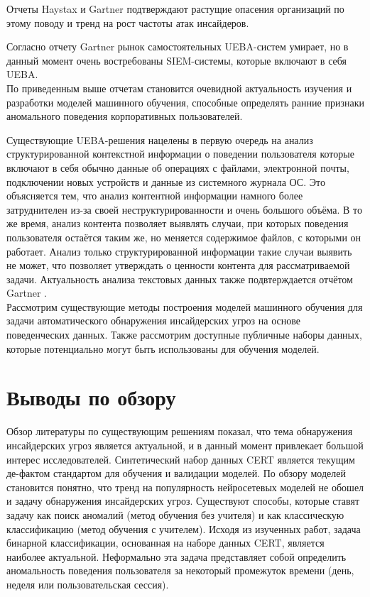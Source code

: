 Отчеты Haystax \cite{veriatoInsiderThreatReport}\cite{companyInsiderThreatReport} и Gartner \cite{EmergingInsiderThreat2018} подтверждают растущие опасения организаций по этому поводу и тренд на рост частоты атак инсайдеров.

Согласно отчету Gartner \cite{GartnerReportMarket2019} рынок самостоятельных UEBA-систем умирает, но в данный момент очень востребованы SIEM-системы, которые включают в себя UEBA.\\

По приведенным выше отчетам становится очевидной актуальность изучения и разработки моделей машинного обучения, способные определять ранние признаки аномального поведения корпоративных пользователей.

Существующие UEBA-решения нацелены в первую очередь на анализ структурированной контекстной информации о поведении пользователя которые включают в себя обычно данные об операциях с файлами, электронной почты, подключении новых устройств и данные из системного журнала ОС. Это объясняется тем, что анализ контентной информации намного более затруднителен из-за своей неструктурированности и очень большого объёма. В то же время, анализ контента позволяет выявлять случаи, при которых поведения пользователя остаётся таким же, но меняется содержимое файлов, с которыми он работает. Анализ только структурированной информации такие случаи выявить не может, что позволяет утверждать о ценности контента для рассматриваемой задачи. Актуальность анализа текстовых данных также подвтерждается отчётом Gartner \cite{GartnerReportMarket2019}.\\

Рассмотрим существующие методы построения моделей машинного обучения для задачи автоматического обнаружения инсайдерских угроз на основе поведенческих данных. Также рассмотрим доступные публичные наборы данных, которые потенциально могут быть использованы для обучения моделей.



\section{Выводы по обзору}

Обзор литературы по существующим решениям показал, что тема обнаружения инсайдерских угроз является актуальной, и в данный момент привлекает большой интерес исследователей. Синтетический набор данных CERT является текущим де-фактом стандартом для обучения и валидации моделей. По обзору моделей становится понятно, что тренд на популярность нейросетевых моделей не обошел и задачу обнаружения инсайдерских угроз. Существуют способы, которые ставят задачу как поиск аномалий (метод обучения без учителя) и как классическую классификацию (метод обучения с учителем). Исходя из изученных работ, задача бинарной классификации, основанная на наборе данных CERT, является наиболее актуальной. Неформально эта задача представляет собой определить аномальность поведения пользователя за некоторый промежуток времени (день, неделя или пользовательская сессия).
